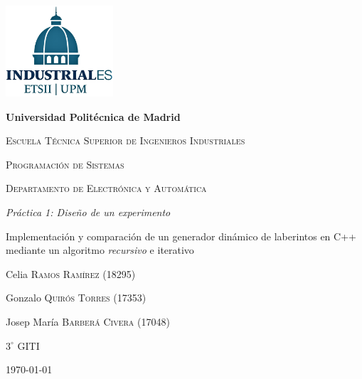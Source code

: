 \documentclass[12pt,a4paper]{article}
\newcommand{\grad}{^{\circ}}
\begin{document}
	\begin{titlepage}
	\centering
    {\includegraphics[width=0.3\textwidth]{fotos/Logo_azul.png}\par}
	\vspace{1cm}
	{\bfseries\LARGE Universidad Politécnica de Madrid \par}
	\vspace{1cm}
	{\scshape\Large Escuela Técnica Superior de Ingenieros Industriales \par}
	\vspace{2.5cm}
	{\scshape\Huge Programación de Sistemas \par}
	\vspace{0.75cm}
	{\scshape\large Departamento de Electrónica y Automática \par}
	\vspace{2cm}
    {\itshape\LARGE Práctica 1: Diseño de un experimento \par}
    \vspace{0.5cm}
    {\upshape\large Implementación y comparación de un generador dinámico de laberintos en C++ mediante un algoritmo \textit{recursivo} e iterativo}
	\vfill
	{\large{Celia \textsc{Ramos Ramírez} (18295)\par}}
	\vspace{0.1cm}
    {\large{Gonzalo \textsc{Quirós Torres} (17353)\par}}
	\vspace{0.1cm}
	{\large{Josep María \textsc{Barberá Civera} (17048)\par}}
	\vfill
	{\Large{ $3\grad$ \textsc{GITI}}\par}
	\vfill
	{\Large \today \par}
	\end{titlepage}
	
\end{document}
